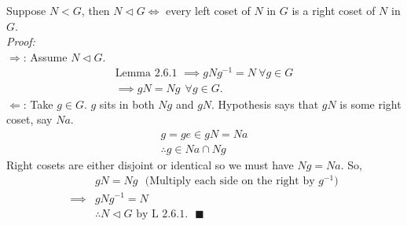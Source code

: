 \begin{lemma}
Suppose $N< G$, then $N\triangleleft G \iff $ every left coset of $N$ in $G$ is a right coset of $N$ in $G$. \\
\textit{Proof:}\\
$\Rightarrow$: Assume $N\triangleleft G$.
\begin{align}
    \text{Lemma 2.6.1 }\implies gNg^{-1}= N \ \forall g \in G \nonumber \\
    \implies gN=Ng \ \ \forall g \in G. \nonumber
\end{align}
$\Leftarrow$: Take $g\in G$. $g$ sits in both $Ng$ and $gN$. Hypothesis says that $gN$ is some right coset, say $Na$.
\begin{align}
    g=ge\in g N = Na \nonumber \\
    \therefore g \in Na\cap Ng \nonumber
\end{align}
Right cosets are either disjoint or identical so we must have $Ng=Na$. So,
\begin{align}
    &gN=Ng \ \ \ \text{(Multiply each side on the right by $g^{-1}$)} \nonumber \\
    \implies &gNg^{-1}=N \nonumber \\
    &\therefore N \triangleleft G \text{ by L 2.6.1}. \ \ \ \blacksquare \nonumber 
\end{align}
\end{lemma}


